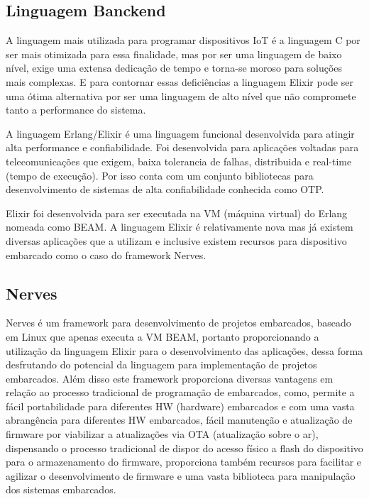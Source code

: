 \documentclass[../../layout.tex]{subfiles}
\begin{document}
\subsection{Linguagem Banckend}
\hspace*{3em}A linguagem mais utilizada para programar dispositivos IoT é a linguagem C por ser mais otimizada para essa finalidade, mas por ser uma linguagem de baixo nível, exige uma extensa dedicação de tempo e torna-se moroso para soluções mais complexas. E para contornar essas deficiências a linguagem Elixir pode ser uma ótima alternativa por ser uma linguagem de alto  nível que não compromete tanto a performance do sistema.\par
A linguagem Erlang/Elixir é uma linguagem funcional desenvolvida para atingir alta performance e confiabilidade. Foi desenvolvida para aplicações voltadas para telecomunicações que exigem, baixa tolerancia de falhas, distribuida e real-time (tempo de execução). Por isso conta com um conjunto bibliotecas para desenvolvimento de sistemas de alta confiabilidade conhecida como OTP.\par
Elixir foi desenvolvida para ser executada na VM (máquina virtual) do Erlang nomeada como BEAM. A linguagem Elixir é relativamente nova mas já existem diversas aplicações que a utilizam e inclusive existem recursos para dispositivo embarcado como o caso do framework Nerves.\cite{ElixirorIoT}

\subsection{Nerves}
\hspace*{3em}Nerves é um framework para desenvolvimento de projetos embarcados, baseado em Linux que apenas executa a VM BEAM, portanto proporcionando a utilização da linguagem Elixir para o desenvolvimento das aplicações, dessa forma desfrutando do potencial da linguagem para implementação de projetos embarcados. Além disso este framework proporciona diversas vantagens  em relação ao processo tradicional de programação de embarcados, como, permite a fácil portabilidade para diferentes HW (hardware) embarcados e com uma vasta abrangência para diferentes HW embarcados, fácil manutenção e atualização de firmware por viabilizar a atualizações via OTA (atualização sobre o ar), dispensando o processo tradicional de dispor do acesso físico a flash do dispositivo para o armazenamento do firmware, proporciona também recursos para facilitar e agilizar o desenvolvimento de firmware e uma vasta biblioteca para manipulação dos sistemas embarcados. 
\end{document}
